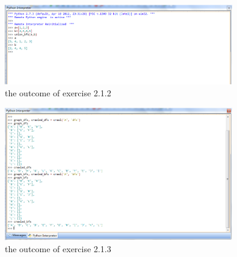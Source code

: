 \documentclass{article}
\begin{document}
\begin{figure}[htbp]
\centering
\includegraphics[width=10cm]{2.png}
\caption{the outcome of exercise 2.1.2}
\end{figure}
\begin{figure}[htbp]
\centering
\includegraphics[width=10cm]{3.png}
\caption{the outcome of exercise 2.1.3}
\end{figure}
\end{document}
